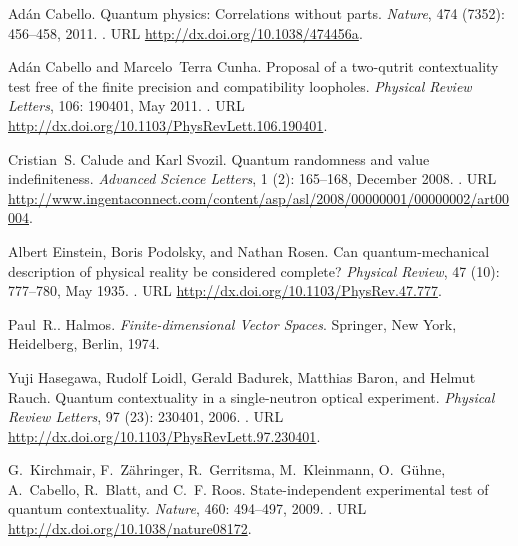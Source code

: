 \documentclass[runningheads]{llncs}
\begin{document}
\begin{thebibliography}{25}
Ad\'an Cabello.
\newblock Quantum physics: Correlations without parts.
\newblock \emph{Nature}, 474 (7352): 456--458, 2011.
\newblock {}.
\newblock URL \url{http://dx.doi.org/10.1038/474456a}.

Ad\'an Cabello and Marcelo~Terra Cunha.
\newblock Proposal of a two-qutrit contextuality test free of the finite
  precision and compatibility loopholes.
\newblock \emph{Physical Review Letters}, 106: 190401, May 2011.
\newblock {}.
\newblock URL \url{http://dx.doi.org/10.1103/PhysRevLett.106.190401}.

Cristian~S. Calude and Karl Svozil.
\newblock Quantum randomness and value indefiniteness.
\newblock \emph{Advanced Science Letters}, 1 (2): 165--168,
  December 2008.
\newblock {}.
\newblock URL
  \url{http://www.ingentaconnect.com/content/asp/asl/2008/00000001/00000002/art00004}.

Albert Einstein, Boris Podolsky, and Nathan Rosen.
\newblock Can quantum-mechanical description of physical reality be considered
  complete?
\newblock \emph{Physical Review}, 47 (10): 777--780, May
  1935.
\newblock {}.
\newblock URL \url{http://dx.doi.org/10.1103/PhysRev.47.777}.

Paul~R.. Halmos.
\newblock \emph{Finite-dimensional Vector Spaces}.
\newblock Springer, New York, Heidelberg, Berlin, 1974.

Yuji Hasegawa, Rudolf Loidl, Gerald Badurek, Matthias Baron, and Helmut Rauch.
\newblock Quantum contextuality in a single-neutron optical experiment.
\newblock \emph{Physical Review Letters}, 97 (23): 230401,
  2006.
\newblock {}.
\newblock URL \url{http://dx.doi.org/10.1103/PhysRevLett.97.230401}.

G.~Kirchmair, F.~Z{\"{a}}hringer, R.~Gerritsma, M.~Kleinmann, O.~G{\"{u}}hne,
  A.~Cabello, R.~Blatt, and C.~F. Roos.
\newblock State-independent experimental test of quantum contextuality.
\newblock \emph{Nature}, 460: 494--497, 2009.
\newblock {}.
\newblock URL \url{http://dx.doi.org/10.1038/nature08172}.


\end{thebibliography}
\end{document}
